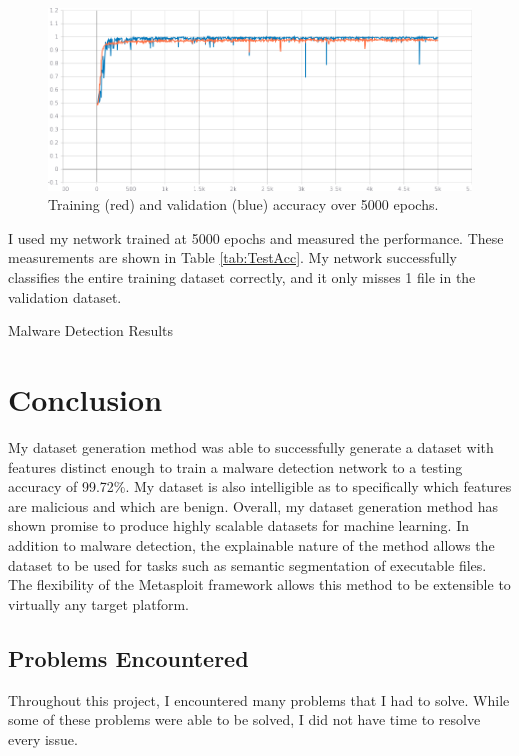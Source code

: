 \documentclass[12pt, letterpaper, titlepage]{article}
\newcommand{\tabRef}[1]{Table \ref{#1}}
\newcommand{\metasploit}{Metasploit}
\newcommand{\maxTrainingEpochs}{5000}
\newcommand{\testAccuracy}{99.72\%}
\begin{document}
\begin{figure}[H]
  \centering
  \includegraphics[width=\textwidth, keepaspectratio]{Images/epoch_accuracy_5k.png}
  \caption{Training (red) and validation (blue) accuracy over 5000 epochs.}
  \label{fig:AccVsEpochs}
\end{figure}

I used my network trained at \maxTrainingEpochs{} epochs and measured the performance.
These measurements are shown in \tabRef{tab:TestAcc}.
My network successfully classifies the entire training dataset correctly, and it only misses 1 file in the validation dataset.

\begin{table}[H]
  \caption{Malware Detection Results}
  \begin{center}
  \end{center}
  \label{tab:TestAcc}
\end{table}

\pagebreak

\section{Conclusion}
My dataset generation method was able to successfully generate a dataset with features distinct enough to train a malware detection network to a testing accuracy of \testAccuracy{}.
My dataset is also intelligible as to specifically which features are malicious and which are benign.
Overall, my dataset generation method has shown promise to produce highly scalable datasets for machine learning.
In addition to malware detection, the explainable nature of the method allows the dataset to be used for tasks such as semantic segmentation of executable files.
The flexibility of the \metasploit{} framework allows this method to be extensible to virtually any target platform.

\subsection{Problems Encountered}
Throughout this project, I encountered many problems that I had to solve.
While some of these problems were able to be solved, I did not have time to resolve every issue.
\end{document}
